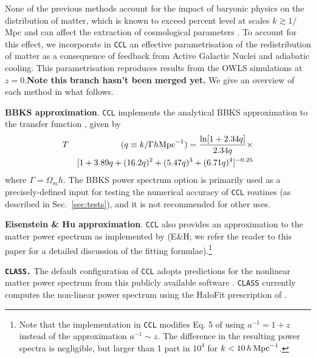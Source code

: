 \documentclass[\docopts]{\docclass}
\newcommand{\ccl}{{\tt CCL}\xspace}
\begin{document}
None of the previous methods account for the impact of baryonic physics on the distribution of matter, which is known to exceed percent level at scales $k \gtrsim 1/$Mpc \citep{vanDaalen11,Illustris,Hellwing16,Springel17} and can affect the extraction of cosmological parameters \citep{Semboloni11,Semboloni13,Mohammed14,Eifler15,Mohammed17}. To account for this effect, we incorporate in \ccl an effective parametrisation \citep{Schneider15} of the redistribution of matter as a consequence of feedback from Active Galactic Nuclei and adiabatic cooling. This parametrisation reproduces results from the OWLS simulations at $z=0$.{\bf Note this branch hasn't been merged yet.} We give an overview of each method in what follows.

{\bf BBKS approximation}. \ccl implements the analytical BBKS approximation to the transfer function \citep{BBKS}, given by
\begin{eqnarray}
  T&&(q\equiv k/\Gamma h {\rm Mpc}^{-1}) = \frac{\ln[1+2.34q]}{2.34q}\times\\
  &&[1+3.89q+(16.2q)^2+(5.47q)^3+(6.71q)^4]^{-0.25}\nonumber
\end{eqnarray}
where $\Gamma = \Omega_m h$. The BBKS power spectrum option is primarily used as a precisely-defined input for testing the numerical accuracy of \ccl routines (as described in Sec.~\ref{sec:tests}), and it is not recommended for other uses.

{\bf Eisenstein \& Hu approximation}. \ccl also provides an approximation to the matter power spectrum as implemented by \citet{1998ApJ...496..605E} (E\&H; we refer the reader to this paper for a detailed discussion of the fitting formulae).\footnote{Note that the implementation in \ccl modifies Eq. 5 of \citet{1998ApJ...496..605E} using $a^{-1}=1+z$ instead of the approximation $a^{-1}\sim z$. The difference in the resulting power spectra is negligible, but larger than 1 part in $10^4$ for $k<10\,h\,{\rm Mpc}^{-1}$.}

{\bf \tt CLASS.} The default configuration of \ccl adopts predictions for the nonlinear matter power spectrum from this publicly available software \citep{class}. {\tt CLASS} currently computes the non-linear power spectrum using the HaloFit prescription of \cite{CLASS_halofit}.
\end{document}
